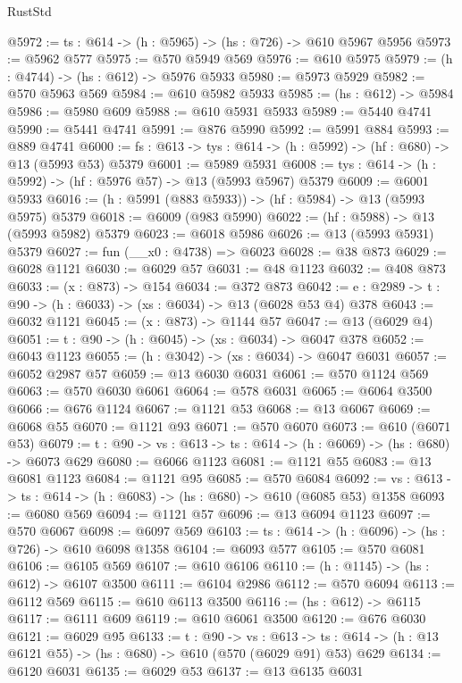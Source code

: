 \begin{lexlean}{RustStd}
\begin{coremodule}
@5972 := {ts : @614} -> (h : @5965) -> (hs : @726) -> @610 @5967 @5956
@5973 := @5962 @577
@5975 := @570 @5949 @569
@5976 := @610 @5975
@5979 := (h : @4744) -> (hs : @612) -> @5976 @5933
@5980 := @5973 @5929
@5982 := @570 @5963 @569
@5984 := @610 @5982 @5933
@5985 := (hs : @612) -> @5984
@5986 := @5980 @609
@5988 := @610 @5931 @5933
@5989 := @5440 @4741
@5990 := @5441 @4741
@5991 := @876 @5990
@5992 := @5991 @884
@5993 := @889 @4741
@6000 := {fs : @613} -> {tys : @614} -> (h : @5992) -> (hf : @680) -> @13 (@5993 @53) @5379
@6001 := @5989 @5931
@6008 := {tys : @614} -> (h : @5992) -> (hf : @5976 @57) -> @13 (@5993 @5967) @5379
@6009 := @6001 @5933
@6016 := (h : @5991 (@883 @5933)) -> (hf : @5984) -> @13 (@5993 @5975) @5379
@6018 := @6009 (@983 @5990)
@6022 := (hf : @5988) -> @13 (@5993 @5982) @5379
@6023 := @6018 @5986
@6026 := @13 (@5993 @5931) @5379
@6027 := fun (__x0 : @4738) => @6023
@6028 := @38 @873
@6029 := @6028 @1121
@6030 := @6029 @57
@6031 := @48 @1123
@6032 := @408 @873
@6033 := (x : @873) -> @154
@6034 := @372 @873
@6042 := {e : @2989} -> {t : @90} -> (h : @6033) -> (xs : @6034) -> @13 (@6028 @53 @4) @378
@6043 := @6032 @1121
@6045 := (x : @873) -> @1144 @57
@6047 := @13 (@6029 @4)
@6051 := {t : @90} -> (h : @6045) -> (xs : @6034) -> @6047 @378
@6052 := @6043 @1123
@6055 := (h : @3042) -> (xs : @6034) -> @6047 @6031
@6057 := @6052 @2987 @57
@6059 := @13 @6030 @6031
@6061 := @570 @1124 @569
@6063 := @570 @6030 @6061
@6064 := @578 @6031
@6065 := @6064 @3500
@6066 := @676 @1124
@6067 := @1121 @53
@6068 := @13 @6067
@6069 := @6068 @55
@6070 := @1121 @93
@6071 := @570 @6070
@6073 := @610 (@6071 @53)
@6079 := {t : @90} -> {vs : @613} -> {ts : @614} -> (h : @6069) -> (hs : @680) -> @6073 @629
@6080 := @6066 @1123
@6081 := @1121 @55
@6083 := @13 @6081 @1123
@6084 := @1121 @95
@6085 := @570 @6084
@6092 := {vs : @613} -> {ts : @614} -> (h : @6083) -> (hs : @680) -> @610 (@6085 @53) @1358
@6093 := @6080 @569
@6094 := @1121 @57
@6096 := @13 @6094 @1123
@6097 := @570 @6067
@6098 := @6097 @569
@6103 := {ts : @614} -> (h : @6096) -> (hs : @726) -> @610 @6098 @1358
@6104 := @6093 @577
@6105 := @570 @6081
@6106 := @6105 @569
@6107 := @610 @6106
@6110 := (h : @1145) -> (hs : @612) -> @6107 @3500
@6111 := @6104 @2986
@6112 := @570 @6094
@6113 := @6112 @569
@6115 := @610 @6113 @3500
@6116 := (hs : @612) -> @6115
@6117 := @6111 @609
@6119 := @610 @6061 @3500
@6120 := @676 @6030
@6121 := @6029 @95
@6133 := {t : @90} ->
  {vs : @613} ->
  {ts : @614} -> (h : @13 @6121 @55) -> (hs : @680) -> @610 (@570 (@6029 @91) @53) @629
@6134 := @6120 @6031
@6135 := @6029 @53
@6137 := @13 @6135 @6031

\end{coremodule}
\end{lexlean}

